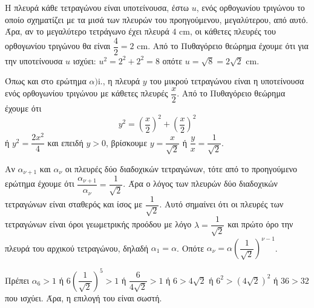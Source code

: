 
\begin{alist}
\item
\begin{rlist}
\item Η πλευρά κάθε τετραγώνου είναι υποτείνουσα, έστω $u$, ενός ορθογωνίου τριγώνου το οποίο σχηματίζει με τα μισά των πλευρών του προηγούμενου, μεγαλύτερου, από αυτό. Άρα, αν το μεγαλύτερο τετράγωνο έχει πλευρά $4 \text{ cm}$, οι κάθετες πλευρές του ορθογωνίου τριγώνου θα είναι $\dfrac{4}{2} = 2 \text{ cm}$. Από το Πυθαγόρειο θεώρημα έχουμε ότι για την υποτείνουσα $u$ ισχύει:
$u^2 = 2^2 + 2^2 = 8$
οπότε $u = \sqrt{8} = 2\sqrt{2} \text{ cm}$.

\item Όπως και στο ερώτημα $\alpha)$i., η πλευρά $y$ του μικρού τετραγώνου είναι η υποτείνουσα ενός ορθογωνίου τριγώνου με κάθετες πλευρές $\dfrac{x}{2}$. Από το Πυθαγόρειο θεώρημα έχουμε ότι
\[y^2 = \left(\dfrac{x}{2}\right)^2 + \left(\dfrac{x}{2}\right)^2\]
ή
$y^2 = \dfrac{2x^2}{4}$
και επειδή $y > 0$, βρίσκουμε $y = \dfrac{x}{\sqrt{2}}$ ή $\dfrac{y}{x} = \dfrac{1}{\sqrt{2}}$.
\end{rlist}

\item Αν $\alpha_{\nu+1}$ και $\alpha_\nu$ οι πλευρές δύο διαδοχικών τετραγώνων, τότε από το προηγούμενο ερώτημα έχουμε ότι $\dfrac{\alpha_{\nu+1}}{\alpha_\nu} = \dfrac{1}{\sqrt{2}}$. Άρα ο λόγος των πλευρών δύο διαδοχικών τετραγώνων είναι σταθερός και ίσος με $\dfrac{1}{\sqrt{2}}$. Αυτό σημαίνει ότι οι πλευρές των τετραγώνων είναι όροι γεωμετρικής προόδου με λόγο $\lambda = \dfrac{1}{\sqrt{2}}$ και πρώτο όρο την πλευρά του αρχικού τετραγώνου, δηλαδή $\alpha_1 = \alpha$. Οπότε $\alpha_\nu = \alpha \left(\dfrac{1}{\sqrt{2}}\right)^{\nu-1}$.

\item Πρέπει
$\alpha_6 > 1$ ή $6 \left(\dfrac{1}{\sqrt{2}}\right)^5 > 1$ ή $\dfrac{6}{4\sqrt{2}} > 1$ ή $6 > 4\sqrt{2}$ ή
$6^2 > (4\sqrt{2})^2$ ή $36 > 32$
που ισχύει. Άρα, η επιλογή του είναι σωστή.
\end{alist}

